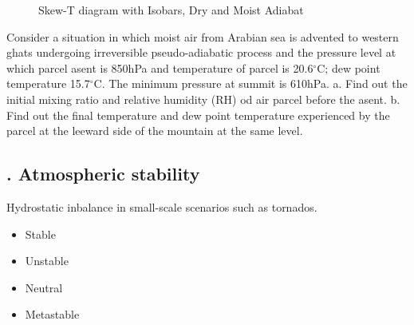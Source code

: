 \documentclass[fleqn,10pt]{SelfArx} %
\begin{document}
\begin{enumerate}[noitemsep]
\begin{figure}[ht]
            \caption{Skew-T diagram with Isobars, Dry and Moist Adiabat}
        \end{figure}
\end{enumerate}

\begin{question}[\label:24.1]{Consider a situation in which moist air from Arabian sea is advented to western ghats undergoing irreversible pseudo-adiabatic process and the pressure level at which parcel asent is 850hPa and temperature of parcel is 20.6$^\circ$C; dew point temperature 15.7$^\circ$C. The minimum pressure at summit is 610hPa. \newline
    a. Find out the initial mixing ratio and relative humidity (RH) od air parcel before the asent. \newline
    b. Find out the final temperature and dew point temperature experienced by the parcel at the leeward side of the mountain at the same level.}
    
\end{question}

\subsection{. Atmospheric stability}
Hydrostatic inbalance in small-scale scenarios such as tornados.
\begin{itemize}[noitemsep]
    \item Stable
    \item Unstable
    \item Neutral
    \item Metastable
\end{itemize}
\clearpage
\end{document}
